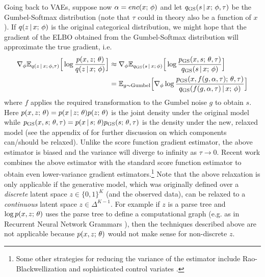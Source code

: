 \documentclass{article}
\begin{document}
Going back to VAEs, suppose now $\alpha = enc(x ; \, \phi)$ and let 
$q_\text{GS}(s \,|\, x ; \, \phi, \tau)$ be the Gumbel-Softmax distribution (note that $\tau$ could in theory also be a function of $x$). If $q(z \,|\, x ; \, \phi)$ is the original categorical distribution, we might hope that the gradient of the ELBO
obtained from the Gumbel-Softmax distribution will approximate the true gradient, i.e.
\begin{align*}
    \nabla_\phi \mathbb{E}_{q(z \,|\, x ; \, \phi, \tau)}\Big[\log \frac{p(x, z ; \, \theta)}{q(z \,|\, x ; \, \phi)} \Big] & \approx \nabla_\phi \mathbb{E}_{q_\text{GS}(s \,|\, x ; \, \phi)}\Big[\log \frac{p_\text{GS}(x,s  ; \, \theta, \tau)}{q_\text{GS}(s \,|\, x ; \, \phi)}\Big] \\
    &= \mathbb{E}_{g \sim \text{Gumbel}}\Big[ \nabla_\phi \log \frac{p_\text{GS}(x, f(g, \alpha, \tau)  ; \, \theta, \tau)}{q_\text{GS}( f(g, \alpha, \tau) \,|\, x ; \, \phi)}\Big]
\end{align*}
where $f$ applies the required transformation to the Gumbel noise $g$ to obtain $s$.
Here $p(x, z ; \, \theta) = p(x \,|\, z ; \, \theta)p(z ; \, \theta)$ is the joint density under the original model while $p_\text{GS}(x, s ; \, \theta, \tau) = p(x \,|\, s ; \, \theta)p_\text{GS}(s ; \, \theta, \tau)$ is the density under the new, relaxed model (see the appendix of \cite{Maddison2017} for further discussion on which components can/should be relaxed). Unlike the score function gradient estimator, the above estimator is biased and the variance
will diverge to infinity as $\tau \rightarrow 0$. Recent work \citep{Tucker2017,Grathwohl2018} combines
the above estimator with the standard score function estimator to obtain even lower-variance
gradient estimators.\footnote{Some other strategies for reducing the variance of the estimator
include Rao-Blackwellization \citep{Ranganath2014} and sophisticated control variates \citep{Mnih2014,miller2017,deng2018}.} Note that the above relaxation is
only applicable if the generative model, which was originally defined over
a \emph{discrete} latent space $z \in \{0, 1\}^K$ (and the observed data),
can be relaxed to a \emph{continuous} latent space $z \in \Delta^{K-1}$. For example if $z$
is a parse tree and $\log p(x , z ; \, \theta)$ uses the parse tree to define a 
computational graph (e.g. as in Recurrent Neural Network Grammars \citep{dyer2016rnng}),
then the techniques described above are not applicable because $p(x, z ; \, \theta)$
would not make sense for non-discrete $z$.
\end{document}
